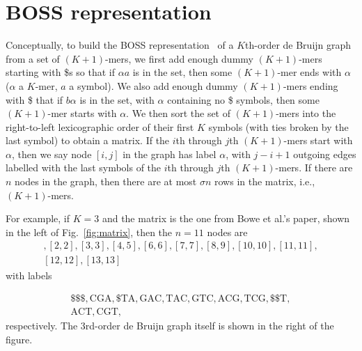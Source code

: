 \section{BOSS representation}
\label{sec:BOSS}


Conceptually, to build the BOSS representation~\cite{bowe} of a $K$th-order de Bruijn graph from a set of \((K + 1)\)-mers, we first add enough dummy \((K + 1)\)-mers starting with \$s so that if \(\alpha a\) is in the set, then some \((K + 1)\)-mer ends with $\alpha$ ($\alpha$ a $K$-mer, $a$ a symbol).  We also add enough dummy \((K + 1)\)-mers ending with \$ that if \(b \alpha\) is in the set, with $\alpha$ containing no \$ symbols, then some \((K + 1)\)-mer starts with $\alpha$.  We then sort the set of \((K + 1)\)-mers into the right-to-left lexicographic order of their first $K$ symbols (with ties broken by the last symbol) to obtain a matrix.  If the $i$th through $j$th \((K + 1)\)-mers start with $\alpha$, then we say node \([i, j]\) in the graph has label $\alpha$, with \(j - i + 1\) outgoing edges labelled with the last symbols of the $i$th through $j$th \((K + 1)\)-mers.  If there are $n$ nodes in the graph, then there are at most \(\sigma n\) rows in the matrix, i.e., \((K + 1)\)-mers.

For example, if \(K = 3\) and the matrix is the one from Bowe et al.'s paper,
shown in the left of Fig.~\ref{fig:matrix}, then the \(n = 11\) nodes are
\begin{gather*}
 [1, 1], [2, 2], [3, 3], [4, 5], [6, 6], [7, 7], [8, 9], [10,
 10], [11, 11], \\ [12, 12], [13, 13]
\end{gather*}
with labels

\begin{gather*}
 \mathrm{\$\$\$}, \mathrm{CGA}, \mathrm{\$TA}, \mathrm{GAC}, \mathrm{TAC},
\mathrm{GTC}, \mathrm{ACG}, \mathrm{TCG}, \mathrm{\$\$T}, \\
\mathrm{ACT}, \mathrm{CGT},
\end{gather*}%
respectively. The 3rd-order de Bruijn graph itself is shown in the right of the figure.

